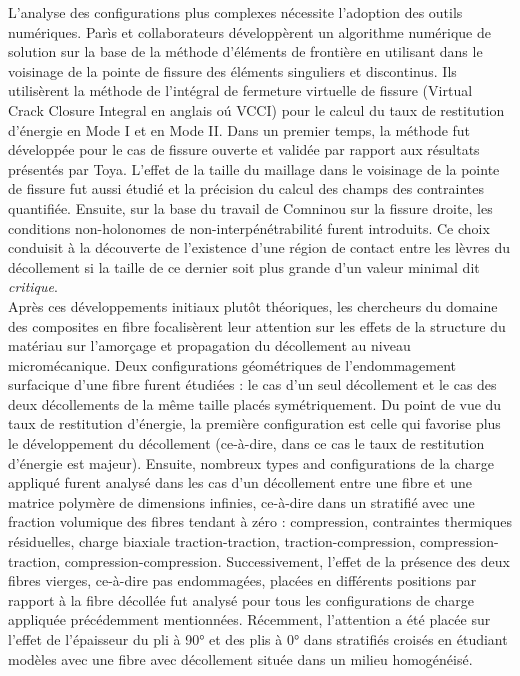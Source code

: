 L'analyse des configurations plus complexes n\'ecessite l'adoption des outils num\'eriques. Par\`is et collaborateurs d\'evelopp\`erent un algorithme num\'erique de solution sur la base de la m\'ethode d'\'el\'ements de fronti\`ere en utilisant dans le voisinage de la pointe de fissure des \'el\'ements singuliers et discontinus. Ils utilis\`erent la m\'ethode de l'int\'egral de fermeture virtuelle de fissure (Virtual Crack Closure Integral en anglais o\'u VCCI) pour le calcul du taux de restitution d'\'energie en Mode I et en Mode II. Dans un premier temps, la m\'ethode fut d\'evelopp\'ee pour le cas de fissure ouverte et valid\'ee par rapport aux r\'esultats pr\'esent\'es par Toya. L'effet de la taille du maillage dans le voisinage de la pointe de fissure fut aussi \'etudi\'e et la pr\'ecision du calcul des champs des contraintes quantifi\'ee. Ensuite, sur la base du travail de Comninou sur la fissure droite, les conditions non-holonomes de non-interp\'en\'etrabilit\'e furent introduits. Ce choix conduisit \`a la d\'ecouverte de l'existence d'une r\'egion de contact entre les l\`evres du d\'ecollement si la taille de ce dernier soit plus grande d'un valeur minimal dit \textit{critique}.\\

Apr\`es ces d\'eveloppements initiaux plutôt th\'eoriques, les chercheurs du domaine des composites en fibre focalis\`erent leur attention sur les effets de la structure du mat\'eriau sur l'amor\c{c}age et propagation du d\'ecollement au niveau microm\'ecanique. Deux configurations g\'eom\'etriques de l'endommagement surfacique d'une fibre furent \'etudi\'ees : le cas d'un seul d\'ecollement et le cas des deux d\'ecollements de la même taille plac\'es sym\'etriquement. Du point de vue du taux de restitution d'\'energie, la premi\`ere configuration est celle qui favorise plus le d\'eveloppement du d\'ecollement (ce-\`a-dire, dans ce cas le taux de restitution d'\'energie est majeur). Ensuite, nombreux types and configurations de la charge appliqu\'e furent analys\'e dans les cas d'un d\'ecollement entre une fibre et une matrice polym\`ere de dimensions infinies, ce-\`a-dire dans un stratifi\'e avec une fraction volumique des fibres tendant \`a z\'ero : compression, contraintes thermiques r\'esiduelles, charge biaxiale traction-traction, traction-compression, compression-traction, compression-compression. Successivement, l'effet de la pr\'esence des deux fibres vierges, ce-\`a-dire pas endommag\'ees, plac\'ees en diff\'erents positions par rapport \`a la fibre d\'ecoll\'ee fut analys\'e pour tous les configurations de charge appliqu\'ee pr\'ec\'edemment mentionn\'ees. R\'ecemment, l'attention a \'et\'e plac\'ee sur l'effet de l'\'epaisseur du pli \`a 90° et des plis \`a 0° dans stratifi\'es crois\'es en \'etudiant mod\`eles avec une fibre avec d\'ecollement situ\'ee dans un milieu homog\'en\'eis\'e.\\

